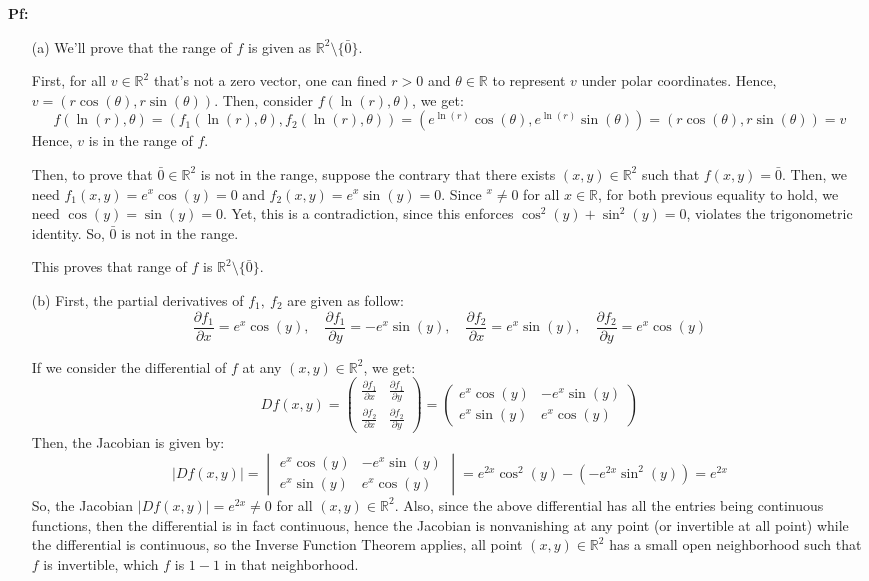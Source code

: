 \documentclass{article}
\begin{document}
\textbf{Pf:}
\begin{itemize}
    \item[(a)] We'll prove that the range of $f$ is given as $\mathbb{R}^2\setminus\{\bar{0}\}$.
    
    First, for all $v\in\mathbb{R}^2$ that's not a zero vector, one can fined $r>0$ and $\theta\in\mathbb{R}$ to represent $v$ under polar coordinates.
    Hence, $v = (r\cos(\theta),r\sin(\theta))$. Then, consider $f(\ln(r),\theta)$, we get:
    $$f(\ln(r),\theta)=\left(f_1(\ln(r),\theta),f_2(\ln(r),\theta)\right) = (e^{\ln(r)}\cos(\theta),e^{\ln(r)}\sin(\theta)) = (r\cos(\theta),r\sin(\theta))=v$$
    Hence, $v$ is in the range of $f$.

    Then, to prove that $\bar{0}\in \mathbb{R}^2$ is not in the range, suppose the contrary that there exists $(x,y)\in\mathbb{R}^2$ such that $f(x,y)=\bar{0}$.
    Then, we need $f_1(x,y)=e^x\cos(y)=0$ and $f_2(x,y)=e^x\sin(y)=0$.
    Since $^x\neq 0$ for all $x\in\mathbb{R}$, for both previous equality to hold, we need $\cos(y)=\sin(y)=0$. Yet, this is a contradiction, since this enforces $\cos^2(y)+\sin^2(y)=0$,
    violates the trigonometric identity. So, $\bar{0}$ is not in the range.

    This proves that range of $f$ is $\mathbb{R}^2\setminus\{\bar{0}\}$.

    \hfil

    \item[(b)] First, the partial derivatives of $f_1,\ f_2$ are given as follow:
    $$\frac{\partial f_1}{\partial x} = e^x\cos(y),\quad \frac{\partial f_1}{\partial y}=-e^x\sin(y),\quad \frac{\partial f_2}{\partial x}=e^x\sin(y),\quad \frac{\partial f_2}{\partial y}=e^x\cos(y)$$
    
    If we consider the differential of $f$ at any $(x,y)\in\mathbb{R}^2$, we get:
    $$Df(x,y) = \begin{pmatrix}
        \frac{\partial f_1}{\partial x} & \frac{\partial f_1}{\partial y}\\
        \frac{\partial f_2}{\partial x} & \frac{\partial f_2}{\partial y}
    \end{pmatrix} = \begin{pmatrix}
        e^x\cos(y) & -e^x\sin(y)\\
        e^x\sin(y) & e^x\cos(y)
    \end{pmatrix}$$
    Then, the Jacobian is given by:
    $$|Df(x,y)| = \begin{vmatrix}
        e^x\cos(y) & -e^x\sin(y)\\
        e^x\sin(y) & e^x\cos(y)
    \end{vmatrix} = e^{2x}\cos^2(y) - (-e^{2x}\sin^2(y)) = e^{2x}$$
    So, the Jacobian $|Df(x,y)|=e^{2x}\neq 0$ for all $(x,y)\in\mathbb{R}^2$. Also, since the above differential has all the entries being continuous functions,
    then the differential is in fact continuous, hence the Jacobian is nonvanishing at any point (or invertible at all point) while the differential is continuous,
    so the Inverse Function Theorem applies, all point $(x,y)\in\mathbb{R}^2$ has a small open neighborhood such that $f$ is invertible, which $f$ is $1-1$ in that neighborhood.


\end{itemize}
\end{document}
